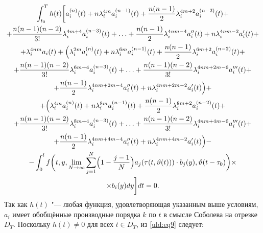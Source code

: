 \begin{multline}
\label{uld:eq9}
\int_{t_0}^T h (t) \biggl[ a_i^{(n)} (t)+n
\lambda_i^{ 4 m}  a_i^{(n-1)} (t)+\frac{n (n-1)}{2}
\lambda _i^{4 m+2} a_i^{(n-2)} (t)+  
\\
+ \frac{n
(n-1) (n-2)}{3 !} \lambda_i^{4 m+4}  a_i^{(n-3)} (t)+
\ldots 
+\frac{n(n-1)}{2} \lambda_i^{ 4 n m-4}  a_i''(t) + n\lambda_i^{ 4 n m-2}
a_i'(t)+ \\ 
+ \lambda_i^{4 n m}a_i (t)+ 
\Bigl( \lambda_i^{2 m} a_i^{(n)} (t)+n \lambda_i^{ 6 m}  a_i^{(n-1)} (t)+
\frac{n (n-1)}{2} \lambda_i^{6 m+2} a_i^{(n-2)} (t)+ \\ + \frac{n (n-1) (n-2)}{3 !} \lambda _i^{6 m+4}
a_i^{ (n-3)} (t) +
\ldots +\frac{n (n-1) (n-2)}{3!} \lambda _i^{ 4 n m+2 m-6}  a_i'''(t)+
\\
 + \frac{n (n-1)}{2} \lambda _i^{ 4 n  m+2 m-4}  a_i''(t)+ n\lambda_i^{4 n  m+2 m-2}
a_i'(t) \Bigr)+ 
\\
+  \Bigl( \lambda_i^{4 m} a_i^{(n)} (t) + n \lambda_i^{8 m}  a_i^{(n-1)} (t)+ 
\frac{n (n-1)}{2} \lambda _i^{8 m+2}  a_i^{ (n-2)} (t) + \\ + \frac{n (n-1) (n-2)}{3 !} \lambda_i^{8 m+4}
a_i^{ (n-3)} (t) + 
\ldots +\frac{n (n-1) (n-2)}{3 !} \lambda _i^{ 4 n m+4 m-6}  a_i'''(t)+
\\
 + \frac{n (n-1)}{2} \lambda _i^{4 n  m+4 m-4} a_i''(t)+n\lambda_i^{4 n m+4 m-2}
a_i'(t)\Bigr)-
\\
-\int_0^l f  \biggl( t,  y , 
\lim \limits_{N\to \infty } \sum\limits_{j =1}^N \Bigl( 1-\frac{j-1}{N} \Bigr) a_j ( \tau  (t,  \vartheta
(t)) )\cdot b_j (y), \vartheta  (t-\tau_0)\biggr)\times
\\
\times b_i (y)  d y \biggr]  dt=0.
\end{multline}
Так как $h (t)$ "--- любая функция, удовлетворяющая указанным выше
условиям,  $a_i$ имеет обобщённые
производные порядка $k$ по $t$ в смысле Соболева на отрезке $D_T$. Поскольку $h (t)\ne 0$ для всех $t\in D_T$, из
\eqref{uld:eq9} следует:
